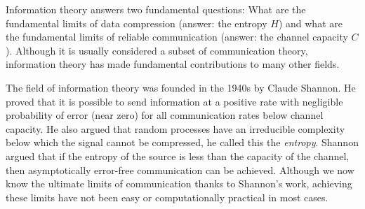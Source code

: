 
Information theory answers two fundamental questions: What are the fundamental limits of data compression (answer: the entropy \(H\)) and what are the fundamental limits of reliable communication (answer: the channel capacity \(C\)). Although it is usually considered a subset of communication theory, information theory has made fundamental contributions to many other fields. 

The field of information theory was founded in the 1940s by Claude Shannon. He proved that it is possible to send information at a positive rate with negligible probability of error (near zero) for all communication rates below channel capacity. He also argued that random processes have an irreducible complexity below which the signal cannot be compressed, he called this the \textit{entropy}. Shannon argued that if the entropy of the source is less than the capacity of the channel, then asymptotically error-free communication can be achieved. Although we now know the ultimate limits of communication thanks to Shannon's work, achieving these limits have not been easy or  computationally practical in most cases. 
